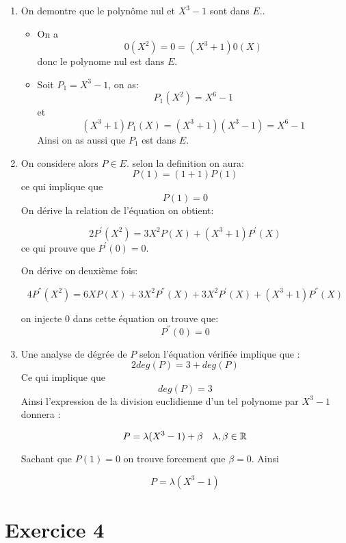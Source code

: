 \documentclass{report}
\begin{document}
\begin{myproof}
  \begin{enumerate}
    \item On demontre que le polynôme nul et $X^3-1$ sont dans $E$..
      \begin{itemize}
        \item On a 
          $$ 0(X^2) = 0 = (X^3+1)0(X) $$ donc le polynome nul est dans $E$.
        \item Soit $P_1 = X^3 - 1$, on as:
          $$
          P_1(X^2) = X^6 - 1
          $$
          et 
          $$
          (X^3+1)P_1(X) = (X^3+1)(X^3-1) = X^6 - 1
          $$
          Ainsi on as aussi que $P_1$ est dans $E$.
      \end{itemize}
    \item On considere alors $P\in E$. selon la definition on aura:
      $$
      P(1) = (1 + 1) P(1)
      $$
      ce qui implique que 
      $$
      P(1) = 0
      $$
      On dérive la relation de l'équation on obtient:

      $$
      2P^{'}(X^2) = 3X^2P(X) + (X^3+1)P^{'}(X)
      $$
      ce qui prouve que $P^{'}(0)= 0$.

      On dérive on deuxième fois:

      $$
      4P^{''}(X^2) = 6XP(X) + 3X^2P^{''}(X) + 3X^2P^{'}(X) + (X^3+1)P^{''}(X)
      $$

      on injecte $0$ dans cette équation on trouve que:
      $$
      P^{''}(0) = 0
      $$
    \item Une analyse de dégrée de $P$ selon l'équation vérifiée implique que :
      $$
      2deg(P) = 3  + deg(P)
      $$
      Ce qui implique que 
      $$
      deg(P) = 3
      $$
      Ainsi l'expression de la division euclidienne d'un tel polynome par $X^3-1$ donnera :

      $$
      P = \lambda (X^3 - 1) + \beta\quad \lambda,\beta \in \mathbb{R}
      $$

      Sachant que $P(1) = 0$ on trouve forcement que $\beta =0$.
      Ainsi

      $$
      P = \lambda (X^3-1)
      $$

  \end{enumerate}
\end{myproof}

\section{Exercice 4} %
\label{sec:Exercice 4}
\end{document}
